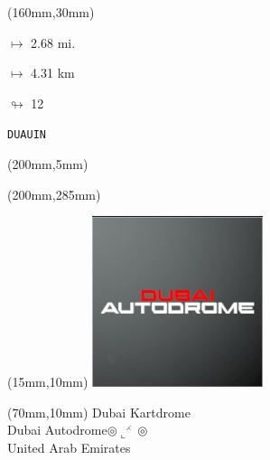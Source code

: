 \begin{textblock*}{40mm}(160mm,30mm)%
\Large
\par$\mapsto$ 2.68 mi.
\par$\mapsto$ 4.31 km
\par$\looparrowright$ 12
\par\hfill\tiny\tt DUAUIN\\
\end{textblock*}
\begin{textblock*}{20mm}(200mm,5mm)%
\fbox{\thepage}
\label{DUAUIN}
\end{textblock*}
\begin{textblock*}{20mm}(200mm,285mm)%
\fbox{\thepage}
\end{textblock*}

\null\newpage
\begin{textblock*}{50mm}(15mm,10mm)%
\includegraphics[width=50mm]{LG/2015-05-20_00081.png}
\end{textblock*}
\begin{textblock*}{130mm}(70mm,10mm)%
{\fontsize{20}{20}\selectfont Dubai Kartdrome\\}
{\fontsize{16}{16}\selectfont Dubai Autodrome\hfill $\circledcirc\llcorner^{\rightthreetimes}\circledcirc$\\}
{\fontsize{12}{12}\selectfont United Arab Emirates\\}
\end{textblock*}
